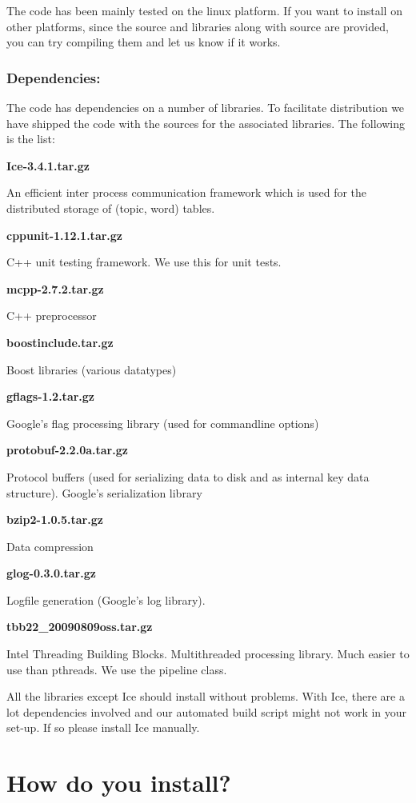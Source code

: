 The code has been mainly tested on the linux platform. If you want to install on other platforms, since the source and libraries along with source are provided, you can try compiling them and let us know if it works. \subsubsection*{Dependencies:}

The code has dependencies on a number of libraries. To facilitate distribution we have shipped the code with the sources for the associated libraries. The following is the list: \par
 
\begin{DoxyEnumerate}
\item 

{\bfseries Ice-\/3.4.1.tar.gz }\par
 An efficient inter process communication framework which is used for the distributed storage of (topic, word) tables. 
\item 

{\bfseries cppunit-\/1.12.1.tar.gz }\par
 C++ unit testing framework. We use this for unit tests. 
\item 

{\bfseries mcpp-\/2.7.2.tar.gz }\par
 C++ preprocessor 
\item 

{\bfseries boostinclude.tar.gz }\par
 Boost libraries (various datatypes) 
\item 

{\bfseries gflags-\/1.2.tar.gz }\par
 Google's flag processing library (used for commandline options) 
\item 

{\bfseries protobuf-\/2.2.0a.tar.gz }\par
 Protocol buffers (used for serializing data to disk and as internal key data structure). Google's serialization library 
\item 

{\bfseries bzip2-\/1.0.5.tar.gz }\par
 Data compression 
\item 

{\bfseries glog-\/0.3.0.tar.gz }\par
 Logfile generation (Google's log library). 
\item 

{\bfseries tbb22\_\-20090809oss.tar.gz }\par
 Intel Threading Building Blocks. Multithreaded processing library. Much easier to use than pthreads. We use the pipeline class. 
\end{DoxyEnumerate}All the libraries except Ice should install without problems. With Ice, there are a lot dependencies involved and our automated build script might not work in your set-\/up. If so please install Ice manually. \section*{How do you install?}



